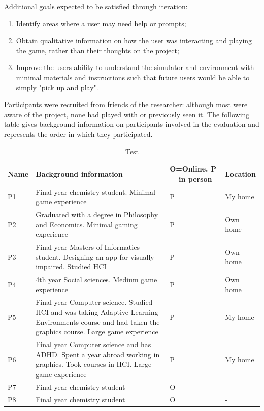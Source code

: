 \documentclass[11pt]{report}
\begin{document}
Additional goals expected to be satisfied through iteration:
\begin{enumerate}
\item Identify areas where a user may need help or prompts;
\item Obtain qualitative information on how the user was interacting and playing the game, rather than their thoughts on the project;
\item Improve the users ability to understand the simulator and environment with minimal materials and instructions such that future users would be able to simply "pick up and play".
\end{enumerate}

Participants were recruited from friends of the researcher: although most were aware of the project, none had played with or previously seen it. The following table gives background information on participants involved in the evaluation and represents the order in which they participated.

\begin{table}[H]
    \begin{tabular}{| p{2cm} | p{9cm} | p{3cm} | p{3cm} |}
    \hline
    Name & Background information & O=Online. P = in person & Location \\
    \hline
    \hline
    P1 & Final year chemistry student. Minimal game experience & P & My home\\ \hline
    P2 & Graduated with a degree in Philosophy and Economics. Minimal gaming experience & P & Own home \\ \hline
    P3 & Final year Masters of Informatics student. Designing an app for visually impaired. Studied HCI & P & Own home \\ \hline
    P4 & 4th year Social sciences. Medium game experience & P & Own home \\ \hline
    P5 & Final year Computer science. Studied HCI and was taking Adaptive Learning Environments course and had taken the graphics course. Large game experience & P & My home \\ \hline
    P6 & Final year Computer science and has ADHD. Spent a year abroad working in graphics. Took courses in HCI. Large game experience & P & My home \\ \hline
    P7 & Final year chemistry student & O & -\\ \hline
    P8 & Final year chemistry student & O & - \\ \hline
    \end{tabular}
    \caption{Test}
\end{table}
\end{document}
